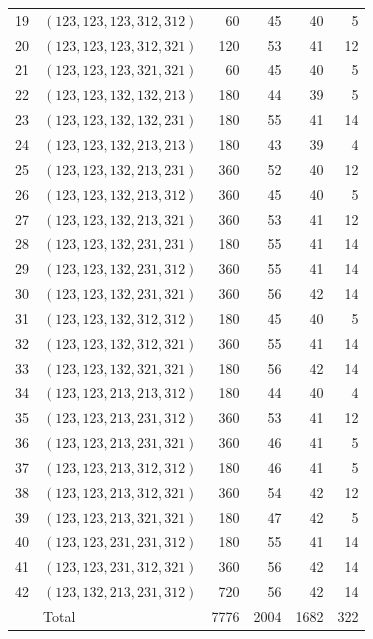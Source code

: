 \documentclass[a4paper,11pt]{amsart}
\numberwithin{equation}{section}
\theoremstyle{definition}
\theoremstyle{remark}
\begin{document}
{\begin{longtable}{@{}rlrrrr@{}}
19 & $(123,123,123,312,312)$ & 60 & 45 & 40 & 5\\
20 & $(123,123,123,312,321)$ & 120 & 53 & 41 & 12\\
21 & $(123,123,123,321,321)$ & 60 & 45 & 40 & 5\\
22 & $(123,123,132,132,213)$ & 180 & 44 & 39 & 5\\
23 & $(123,123,132,132,231)$ & 180 & 55 & 41 & 14\\
24 & $(123,123,132,213,213)$ & 180 & 43 & 39 & 4\\
25 & $(123,123,132,213,231)$ & 360 & 52 & 40 & 12\\
26 & $(123,123,132,213,312)$ & 360 & 45 & 40 & 5\\
27 & $(123,123,132,213,321)$ & 360 & 53 & 41 & 12\\
28 & $(123,123,132,231,231)$ & 180 & 55 & 41 & 14\\
29 & $(123,123,132,231,312)$ & 360 & 55 & 41 & 14\\
30 & $(123,123,132,231,321)$ & 360 & 56 & 42 & 14\\
31 & $(123,123,132,312,312)$ & 180 & 45 & 40 & 5\\
32 & $(123,123,132,312,321)$ & 360 & 55 & 41 & 14\\
33 & $(123,123,132,321,321)$ & 180 & 56 & 42 & 14\\
34 & $(123,123,213,213,312)$ & 180 & 44 & 40 & 4\\
35 & $(123,123,213,231,312)$ & 360 & 53 & 41 & 12\\
36 & $(123,123,213,231,321)$ & 360 & 46 & 41 & 5\\
37 & $(123,123,213,312,312)$ & 180 & 46 & 41 & 5\\
38 & $(123,123,213,312,321)$ & 360 & 54 & 42 & 12\\
39 & $(123,123,213,321,321)$ & 180 & 47 & 42 & 5\\
40 & $(123,123,231,231,312)$ & 180 & 55 & 41 & 14\\
41 & $(123,123,231,312,321)$ & 360 & 56 & 42 & 14\\
42 & $(123,132,213,231,312)$ & 720 & 56 & 42 & 14\\
\midrule
 & Total & 7776 & 2004 & 1682 & 322\\
\end{longtable}
}
\end{document}
